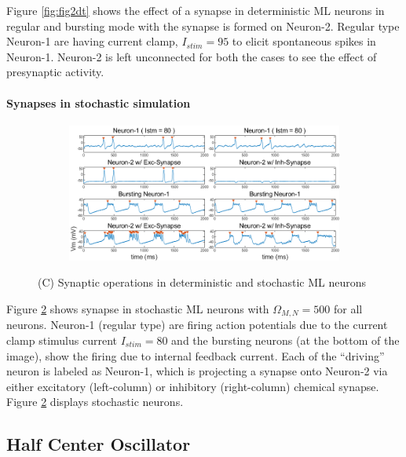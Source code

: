 \documentclass[
]{article}
\begin{document}
Figure \ref{fig:fig2dt} shows the effect of a synapse in deterministic ML neurons in regular and bursting mode with the synapse is formed on Neuron-2. Regular type Neuron-1 are having current clamp, \(I_{stim}=95\) to elicit spontaneous spikes in Neuron-1. Neuron-2 is left unconnected for both the cases to see the effect of presynaptic activity.

\hypertarget{synapses-in-stochastic-simulation}{%
\paragraph{Synapses in stochastic simulation}\label{synapses-in-stochastic-simulation}}

\begin{figure}    \ContinuedFloat
  \captionsetup[subfigure]{labelformat=empty} \centering
  \begin{subfigure}[b]{\textwidth}
      \caption{} \label{fig:fig2st}
      \includegraphics[width=\textwidth]{figs/F2_C_ML_Synapse_Stoch.png}
  \end{subfigure}
  \vspace{-0.5cm}
  \caption{(C) Synaptic operations in deterministic and stochastic ML neurons}
\end{figure}

Figure \ref{fig:fig2st} shows synapse in stochastic ML neurons with \(\Omega_{M,N}=500\) for all neurons. Neuron-1 (regular type) are firing action potentials due to the current clamp stimulus current \(I_{stim}=80\) and the bursting neurons (at the bottom of the image), show the firing due to internal feedback current. Each of the ``driving'' neuron is labeled as Neuron-1, which is projecting a synapse onto Neuron-2 via either excitatory (left-column) or inhibitory (right-column) chemical synapse. Figure \ref{fig:fig2st} displays stochastic neurons.

\hypertarget{hco}{%
\subsection{Half Center Oscillator}\label{hco}}
\end{document}
